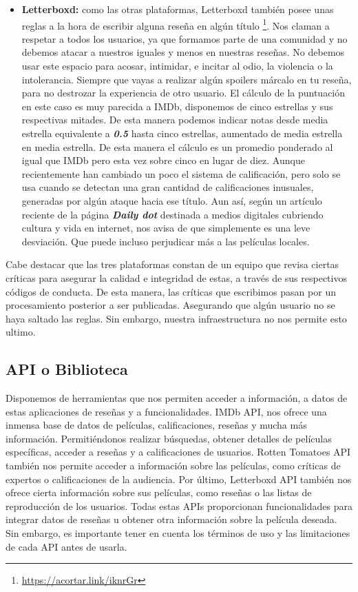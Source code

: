 \begin{itemize}
\item \textbf{Letterboxd:} como las otras plataformas, Letterboxd también posee unas reglas a la hora de escribir alguna reseña en algún título \footnote{\url{https://acortar.link/iknrGr}}. Nos claman a respetar a todos los usuarios, ya que formamos parte de una comunidad y no debemos atacar a nuestros iguales y menos en nuestras reseñas. No debemos usar este espacio para acosar, intimidar, e incitar al odio, la violencia o la intolerancia. Siempre que vayas a realizar algún spoilers márcalo en tu reseña, para no destrozar la experiencia de otro usuario. El cálculo de la puntuación en este caso es muy parecida a IMDb, disponemos de cinco estrellas y sus respectivas mitades. De esta manera podemos indicar notas desde media estrella equivalente a \textbf{\textit{0.5}} hasta cinco estrellas, aumentado de media estrella en media estrella. De esta manera el cálculo es un promedio ponderado al igual que IMDb pero esta vez sobre cinco en lugar de diez. Aunque recientemente han cambiado un poco el sistema de calificación, pero solo se usa cuando se detectan una gran cantidad de calificaciones inusuales, generadas por algún ataque hacia ese título. Aun así, según un artículo \cite{CRletterboxd} reciente de la página \textbf{\textit{Daily dot}} destinada a medios digitales cubriendo cultura y vida en internet, nos avisa de que simplemente es una leve desviación. Que puede incluso perjudicar más a las películas locales.
\end{itemize}

Cabe destacar que las tres plataformas constan de un equipo que revisa ciertas críticas para asegurar la calidad e integridad de estas, a través de sus respectivos códigos de conducta. De esta manera, las críticas que escribimos pasan por un procesamiento posterior a ser publicadas. Asegurando que algún usuario no se haya saltado las reglas. Sin embargo, nuestra infraestructura no nos permite esto ultimo.

\subsection{API o Biblioteca}

Disponemos de herramientas que nos permiten acceder a información, a datos de estas aplicaciones de 
reseñas y a funcionalidades. IMDb API, nos ofrece una inmensa base de datos de películas, 
calificaciones, reseñas y mucha más información. Permitiéndonos realizar búsquedas, obtener detalles de 
películas específicas, acceder a reseñas y a calificaciones de usuarios. Rotten Tomatoes API también 
nos permite acceder a información sobre las películas, como críticas de expertos o calificaciones de la 
audiencia. Por último, Letterboxd API también nos ofrece cierta información sobre sus películas, como 
reseñas o las listas de reproducción de los usuarios. Todas estas APIs proporcionan funcionalidades 
para integrar datos de reseñas u obtener otra información sobre la película deseada. Sin embargo, es 
importante tener en cuenta los términos de uso y las limitaciones de cada API antes de usarla.

